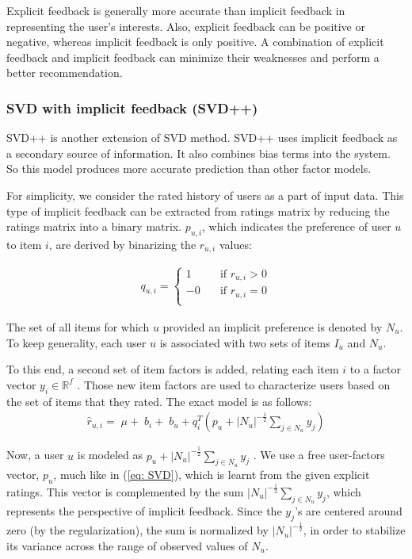 \documentclass[oneside,13pt]{extreport}
\begin{document}
Explicit feedback is generally more accurate than implicit feedback in representing the user’s interests. Also, explicit feedback can be positive or negative, whereas implicit feedback is only positive. A combination of explicit feedback and implicit feedback can minimize their weaknesses and perform a better recommendation.

\subsubsection{SVD with implicit feedback (SVD++)}
SVD++ is another extension of SVD method. SVD++ uses implicit feedback as a secondary source of information. It also combines bias terms into the system. So this model produces more accurate prediction than other factor models. 

For simplicity, we consider the rated history of users as a part of input data. This type of implicit feedback can be extracted from ratings matrix by reducing the ratings matrix into a binary matrix. $p_{u,i}$, which indicates the preference of user $u$ to item $i$, are derived by binarizing the $r_{u,i}$ values:

\begin{eqnarray}
\label{eq:implicit_binary}
q_{u,i} = \begin{cases} 1 & \quad \text{if } r_{u,i} > 0\\ -0 & \quad \text{if } r_{u,i} = 0\\ \end{cases}
\end{eqnarray}

The set of all items for which $u$ provided an implicit preference is denoted by $N_u$. To keep generality, each user $u$ is associated with two sets of items $I_u$ and $N_u$.

To this end, a second set of item factors is added, relating each item $i$ to a factor
vector ${y_i} \in {\mathbb{R}^f}$ . Those new item factors are used to characterize users based on the
set of items that they rated. The exact model is as follows:
\begin{eqnarray}
\label{eq:svd++_pre}
{\hat r_{u,i}} = \;\mu  + \;{b_i} + \;{b_u} + q_i^T\left( {{p_u} + {{\left| {{N_u}} \right|}^{ - \frac{1}{2}}}\sum\limits_{j \in  {N_u}} {{y_j}} } \right)
\end{eqnarray}

Now, a user $u$ is modeled as $p_u + {{\left| {{N_u}} \right|}^{ - \frac{1}{2}}}\sum\limits_{j \in  {N_u}} {{y_j}}$ . We use a free user-factors
vector, $p_u$, much like in (\ref{eq: SVD}), which is learnt from the given explicit ratings. This
vector is complemented by the sum ${{\left| {{N_u}} \right|}^{ - \frac{1}{2}}}\sum\limits_{j \in {N_u}} {{y_j}}$, which represents the perspective
of implicit feedback. Since the $y_j$’s are centered around zero (by the regularization),
the sum is normalized by ${{\left| {{N_u}} \right|}^{ - \frac{1}{2}}}$, in order to stabilize its variance
across the range of observed values of $N_u$.
\end{document}
